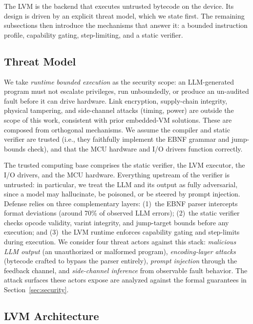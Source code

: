 \documentclass[a4paper,fleqn,longmktitle]{cas-dc}
\begin{document}
The LVM is the backend that executes untrusted bytecode on the device. Its design is driven by an explicit threat model, which we state first. The remaining subsections then introduce the mechanisms that answer it: a bounded instruction profile, capability gating, step-limiting, and a static verifier.

\subsection{Threat Model}
\label{sec:threat}

We take \emph{runtime bounded execution} as the security scope: an LLM-generated program must not escalate privileges, run unboundedly, or produce an un-audited fault before it can drive hardware. Link encryption, supply-chain integrity, physical tampering, and side-channel attacks (timing, power) are outside the scope of this work, consistent with prior embedded-VM solutions. These are composed from orthogonal mechanisms. We assume the compiler and static verifier are trusted (i.e., they faithfully implement the EBNF grammar and jump-bounds check), and that the MCU hardware and I/O drivers function correctly.

The trusted computing base comprises the static verifier, the LVM executor, the I/O drivers, and the MCU hardware. Everything upstream of the verifier is untrusted: in particular, we treat the LLM and its output as fully adversarial, since a model may hallucinate, be poisoned, or be steered by prompt injection. Defense relies on three complementary layers: (1)~the EBNF parser intercepts format deviations (around 70\% of observed LLM errors); (2)~the static verifier checks opcode validity, varint integrity, and jump-target bounds before any execution; and (3)~the LVM runtime enforces capability gating and step-limits during execution. We consider four threat actors against this stack: \emph{malicious LLM output} (an unauthorized or malformed program), \emph{encoding-layer attacks} (bytecode crafted to bypass the parser entirely), \emph{prompt injection} through the feedback channel, and \emph{side-channel inference} from observable fault behavior. The attack surfaces these actors expose are analyzed against the formal guarantees in Section~\ref{sec:security}.

\subsection{LVM Architecture}
\label{sec:mvm_arch}
\end{document}
